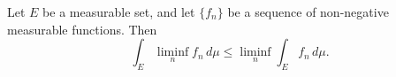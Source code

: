 Let $E$ be a measurable set, and let $\{f_n\}$ be a sequence of non-negative measurable functions. Then
$$\int_E \liminf_n f_n \, d\mu \leq \liminf_n \int_E f_n \, d\mu.$$
